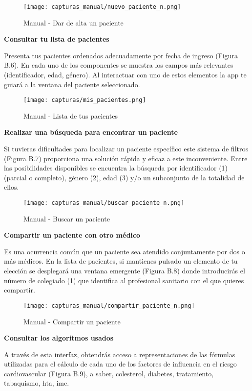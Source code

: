 \documentclass[11pt,spanish,
		listoftables,listoffigures]
		{tfgplantilla}
\begin{document}
\begin{figure}[H]
\centering
\texttt{[image: capturas\_manual/nuevo\_paciente\_n.png]}
\caption{Manual - Dar de alta un paciente}
\end{figure}

\textbf {Consultar tu lista de pacientes}

Presenta tus pacientes ordenados adecuadamente por fecha de ingreso (Figura B.6). En cada uno de los componentes se muestra los campos más relevantes (identificador, edad, género). Al interactuar con uno de estos elementos la app te guiará a la ventana del paciente seleccionado.

\begin{figure}[H]
\centering
\texttt{[image: capturas/mis\_pacientes.png]}
\caption{Manual - Lista de tus pacientes}
\end{figure}

\textbf {Realizar una búsqueda para encontrar un paciente}

Si tuvieras dificultades para localizar un paciente específico este sistema de filtros (Figura B.7) proporciona una solución rápida y eficaz a este inconveniente. Entre las posibilidades disponibles se encuentra la búsqueda por identificador (1) (parcial o completo), género (2), edad (3) y/o un subconjunto de la totalidad de ellos.

\begin{figure}[H]
\centering
\texttt{[image: capturas\_manual/buscar\_paciente\_n.png]}
\caption{Manual - Buscar un paciente}
\end{figure}

\textbf {Compartir un paciente con otro médico}

Es una ocurrencia común que un paciente sea atendido conjuntamente por dos o más médicos. En la lista de pacientes, si mantienes pulsado un elemento de tu elección se desplegará una ventana emergente (Figura B.8) donde introducirás el número de colegiado (1) que identifica al profesional sanitario con el que quieres compartir.

\begin{figure}[H]
\centering
\texttt{[image: capturas\_manual/compartir\_paciente\_n.png]}
\caption{Manual - Compartir un paciente}
\end{figure}

\textbf {Consultar los algoritmos usados}

A través de esta interfaz, obtendrás acceso a representaciones de las fórmulas utilizadas para el cálculo de cada uno de los factores de influencia en el riesgo cardiovascular (Figura B.9), a saber, colesterol, diabetes, tratamiento, tabaquismo, hta, imc.
\end{document}
